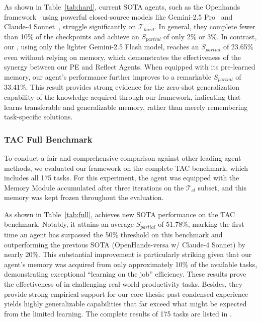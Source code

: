 As shown in Table~\ref{tab:hard}, current SOTA agents, such as the Openhands framework~\citep{wang2024openhands} using powerful closed-source models like Gemini-2.5 Pro~\citep{comanici2025gemini} and Claude-4 Sonnet~\citep{anthropic2025claude4}, struggle significantly on $\mathcal{T}_{hard}$. In general, they complete fewer than 10\% of the checkpoints and achieve an $S_{partial}$ of only 2\% or 3\%. In contrast, our {\method}, using only the lighter Gemini-2.5 Flash model, reaches an $S_{partial}$ of 23.65\% even without relying on memory, which demonstrates the effectiveness of the synergy between our PE and Reflect Agents. When equipped with its pre-learned memory, our agent's performance further improves to a remarkable $S_{partial}$ of 33.41\%. This result provides strong evidence for the zero-shot generalization capability of the knowledge acquired through our framework, indicating that {\method} learns transferable and generalizable memory, rather than merely remembering task-specific solutions.


\subsubsection{TAC Full Benchmark}
\label{sec:full tac}

To conduct a fair and comprehensive comparison against other leading agent methods, we evaluated our framework on the complete TAC benchmark, which includes all 175 tasks. For this experiment, the agent was equipped with the Memory Module accumulated after three iterations on the $\mathcal{T}_{cl}$ subset, and this memory was kept frozen throughout the evaluation.

As shown in Table~\ref{tab:full}, {\method} achieves new SOTA performance on the TAC benchmark. Notably, it attains an average $S_{partial}$ of 51.78\%, marking the first time an agent has surpassed the 50\% threshold on this benchmark and outperforming the previous SOTA (OpenHands-versa w/ Claude-4 Sonnet) by nearly 20\%. This substantial improvement is particularly striking given that our agent's memory was acquired from only approximately 10\% of the available tasks, demonstrating exceptional ``learning on the job'' efficiency. These results prove the effectiveness of {\method} in challenging real-world productivity tasks. Besides, they provide strong empirical support for our core thesis: past condensed experience yields highly generalizable capabilities that far exceed what might be expected from the limited learning.
The complete results of 175 tasks are listed in . 

